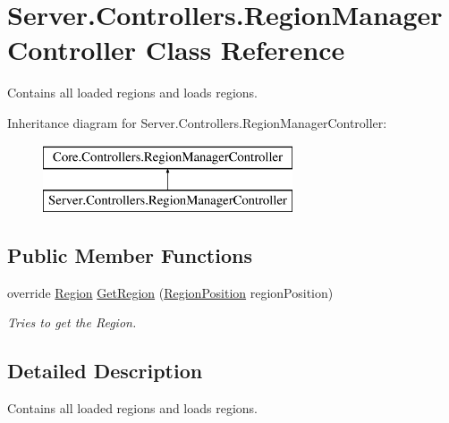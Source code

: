 \hypertarget{classServer_1_1Controllers_1_1RegionManagerController}{\section{Server.\-Controllers.\-Region\-Manager\-Controller Class Reference}
\label{classServer_1_1Controllers_1_1RegionManagerController}
}


Contains all loaded regions and loads regions.  


Inheritance diagram for Server.\-Controllers.\-Region\-Manager\-Controller\-:\begin{figure}[H]
\begin{center}
\leavevmode
\includegraphics[height=2.000000cm]{classServer_1_1Controllers_1_1RegionManagerController}
\end{center}
\end{figure}
\subsection*{Public Member Functions}
\begin{DoxyCompactItemize}
\item 
override \hyperlink{classCore_1_1Models_1_1Region}{Region} \hyperlink{classServer_1_1Controllers_1_1RegionManagerController_a14319718114aedea38984b1bf61395a4}{Get\-Region} (\hyperlink{classCore_1_1Models_1_1RegionPosition}{Region\-Position} region\-Position)
\begin{DoxyCompactList}\small\item\em Tries to get the Region. \end{DoxyCompactList}\end{DoxyCompactItemize}


\subsection{Detailed Description}
Contains all loaded regions and loads regions. 



